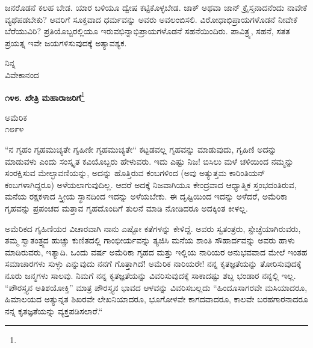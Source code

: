 ಜನರೊಡನೆ ಕಲಹ ಬೇಡ. ಯಾರ ಬಳಿಯೂ ದ್ವೇಷ ಕಟ್ಟಿಕೊಳ್ಳಬೇಡ. ಜಾಕ್ ಅಥವಾ ಜಾನ್ ಕ್ರೈಸ್ತನಾದನೆಂದು ನಾವೇಕೆ ವ್ಯಥೆಪಡಬೇಕು? ಅವರಿಗೆ ಸೂಕ್ತವಾದ ಧರ್ಮವನ್ನು ಅವರು ಅವಲಂಬಿಸಲಿ. ವಿರೋಧಾಭಿಪ್ರಾಯಗಳೊಡನೆ ನೀವೇಕೆ ಬೆರೆಯುವಿರಿ? ಪ್ರತಿಯೊಬ್ಬರಲ್ಲಿಯೂ ಇರುವಭಿನ್ನಾಭಿಪ್ರಾಯಗಳೊಡನೆ ಸಹನೆಯಿಂದಿರು. ಪಾವಿತ್ರ್ಯ, ಸಹನೆ, ಸತತ ಪ್ರಯತ್ನ ಇವೇ ಜಯಗಳಿಸುವುದಕ್ಕೆ ಅತ್ಯಾವಶ್ಯಕ.

\vspace{-.5cm}

{\flushright
ನಿನ್ನ\\ವಿವೇಕಾನಂದ\par}

\vspace{-.3cm}

\begin{center}
\textbf{೧೪೮. ಖೇತ್ರಿ ಮಹಾರಾಜರಿಗೆ}\footnote{}
\end{center}

\vspace{-.8cm}

\begin{flushright}
ಅಮೆರಿಕ\\೧೮೯೪
\end{flushright}

\vspace{-.3cm}

“ನ ಗೃಹಂ ಗೃಹಮುಚ್ಯತೇ ಗೃಹಿಣೀ ಗೃಹಮುಚ್ಯತೇ“ ಕಟ್ಟಡವಲ್ಲ ಗೃಹವನ್ನು ಮಾಡುವುದು, ಗೃಹಿಣಿ ಅದನ್ನು ಮಾಡುವಳು ಎಂದು ಸಂಸ್ಕೃತ ಕವಿಯೊಬ್ಬರು ಹೇಳುವರು. ಇದು ಎಷ್ಟು ನಿಜ! ಬಿಸಿಲು ಮಳೆ ಚಳಿಯಿಂದ ನಮ್ಮನ್ನು ಸಂರಕ್ಷಿಸುವ ಮೇಲ್ಛಾವಣಿಯನ್ನು, ಅದನ್ನು ಹೊತ್ತಿರುವ ಕಂಬಗಳಿಂದ (ಅವು ಅತ್ಯುತ್ತಮ ಕಾರಿಂತಿಯನ್‌ ಕಂಬಗಳಾಗಿದ್ದರೂ) ಅಳೆಯಲಾಗುವುದಿಲ್ಲ. ಆದರೆ ಅದಕ್ಕೆ ನಿಜವಾಗಿಯೂ ಕೇಂದ್ರವಾದ ಆಧ್ಯಾತ್ಮಿಕ ಸ್ತಂಭದಂತಿರುವ, ಮನೆಯ ರಕ್ಷಕಳಾದ ಸ್ತ್ರೀಯ ಸ್ಥಾನದಿಂದ ಇದನ್ನು ಅಳೆಯಬೇಕು. ಈ ದೃಷ್ಟಿಯಿಂದ ಇದನ್ನು ಅಳೆದರೆ, ಅಮೆರಿಕಾ ಗೃಹವನ್ನು ಪ್ರಪಂಚದ ಮತ್ತಾವ ಗೃಹದೊಂದಿಗೆ ತುಲನೆ ಮಾಡಿ ನೋಡಿದರೂ ಅದಕ್ಕಿಂತ ಕೀಳಲ್ಲ.
\vspace{0.5cm}

ಅಮೆರಿಕದ ಗೃಹಿಣಿಯರ ವಿಚಾರವಾಗಿ ನಾನು ಎಷ್ಟೋ ಕತೆಗಳನ್ನು ಕೇಳಿದ್ದೆ. ಅವರು ಸ್ವತಂತ್ರರು, ಸ್ಟೇಚ್ಛೆಯಾಗಿರುವರು, ತಮ್ಮ ಸ್ವಾತಂತ್ರ್ಯದ ಹುಚ್ಚು ಕುಣಿತದಲ್ಲಿ ಗಾಂಭೀರ್ಯವನ್ನು ತ್ಯಜಿಸಿ ಮನೆಯ ಶಾಂತಿ ಸೌಹಾರ್ದವನ್ನು ಅವರು ಹಾಳು ಮಾಡಿರುವರು, ಇತ್ಯಾದಿ. ಒಂದು ವರ್ಷ ಅಮೆರಿಕಾ ಗೃಹದ ಮತ್ತು ಇಲ್ಲಿಯ ನಾರಿಯರ ಅನುಭವವಾದ ಮೇಲೆ ಇಂತಹ ಸಮಾಚಾರಗಳು ಸುಳ್ಳು ಎನ್ನುವುದು ನನಗೆ ಗೊತ್ತಾಗಿದೆ! ಅಮೆರಿಕ ನಾರಿಯರೇ! ನನ್ನ ಕೃತಜ್ಞತೆಯನ್ನು ತೋರಿಸುವುದಕ್ಕೆ ನೂರು ಜನ್ಮಗಳು ಸಾಲವು. ನಿಮಗೆ ನನ್ನ ಕೃತಜ್ಞತೆಯನ್ನು ವಿವರಿಸುವುದಕ್ಕೆ ಸಾಕಾದಷ್ಟು ಶಬ್ದ ಭಂಡಾರ ನನ್ನಲ್ಲಿ ಇಲ್ಲ. “ಪೌರಸ್ತ್ಯನ ಅತಿಶಯೋಕ್ತಿ” ಮಾತ್ರ ಪೌರಸ್ತ್ಯನ ಭಾವದ ಆಳವನ್ನು ವಿವರಿಸಬಲ್ಲದು\enginline{-} “ಹಿಂದೂಸಾಗರವೇ ಮಸಿಯಾದರೂ, ಹಿಮಾಲಯದ ಅತ್ಯುನ್ನತ ಶಿಖರವೇ ಲೇಖನಿಯಾದರೂ, ಭೂಗೋಳವೇ ಕಾಗದವಾದರೂ, ಕಾಲವೇ ಬರಹಗಾರನಾದರೂ ನನ್ನ ಕೃತಜ್ಞತೆಯನ್ನು ವ್ಯಕ್ತಪಡಿಸಲಾರೆ.“
\vspace{0.5cm}

